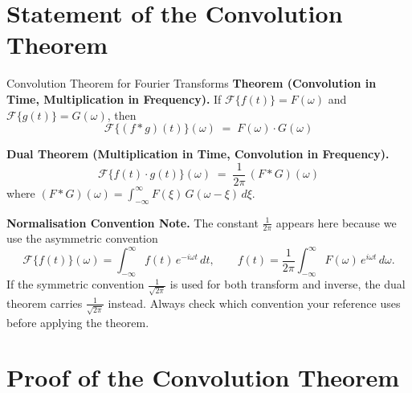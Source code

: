 \documentclass[12pt,a4paper]{article}
\begin{document}
\section{Statement of the Convolution Theorem}

\begin{infobox}{Convolution Theorem for Fourier Transforms}
\textbf{Theorem (Convolution in Time, Multiplication in Frequency).}
If $\mathcal{F}\{f(t)\} = F(\omega)$ and $\mathcal{F}\{g(t)\} = G(\omega)$, then
\[
  \boxed{\mathcal{F}\{(f*g)(t)\}(\omega) \;=\; F(\omega)\cdot G(\omega)}
\]

\medskip
\textbf{Dual Theorem (Multiplication in Time, Convolution in Frequency).}
\[
  \boxed{\mathcal{F}\{f(t)\cdot g(t)\}(\omega) \;=\; \frac{1}{2\pi}\,(F*G)(\omega)}
\]
where $(F*G)(\omega) = \int_{-\infty}^{\infty}F(\xi)\,G(\omega-\xi)\,d\xi$.

\medskip
\textbf{Normalisation Convention Note.}
The constant $\frac{1}{2\pi}$ appears here because we use the asymmetric convention
\[
  \mathcal{F}\{f(t)\}(\omega) = \int_{-\infty}^{\infty} f(t)\,e^{-i\omega t}\,dt,
  \qquad
  f(t) = \frac{1}{2\pi}\int_{-\infty}^{\infty}F(\omega)\,e^{i\omega t}\,d\omega.
\]
If the symmetric convention $\frac{1}{\sqrt{2\pi}}$ is used for both transform and
inverse, the dual theorem carries $\frac{1}{\sqrt{2\pi}}$ instead. Always check
which convention your reference uses before applying the theorem.
\end{infobox}

\section{Proof of the Convolution Theorem}
\end{document}
